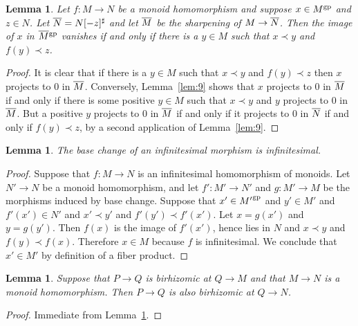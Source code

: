 \documentclass[10pt]{article}
\numberwithin{equation}{section}
\newtheorem{lemma}[paragraph]{Lemma}
\theoremstyle{definition}
\theoremstyle{remark}
\newcommand{\gp}[1]{#1^{\rm gp}}
\renewcommand{\bar}[1]{\overnorm{#1}\vphantom{#1}}
\def\overnorm#1{\overline{#1}\vphantom{#1}}
\begin{document}
\begin{lemma} \label{lem:3}
	Let $f : M \to N$ be a monoid homomorphism and suppose $x \in \gp M$ and $z \in N$.  Let $\bar N = N[-z]^\sharp$ and let $\bar M$ be the sharpening of $M \to \bar N$.  Then the image of $x$ in $\bar M^{\rm gp}$ vanishes if and only if there is a $y \in M$ such that $x \prec y$ and $f(y) \prec z$.
\end{lemma}
\begin{proof}
	It is clear that if there is a $y \in M$ such that $x \prec y$ and $f(y) \prec z$ then $x$ projects to $0$ in $\bar M$.  Conversely, Lemma~\ref{lem:9} shows that $x$ projects to $0$ in $\bar M$ if and only if there is some positive $y \in M$ such that $x \prec y$ and $y$ projects to $0$ in $\bar M$.  But a positive $y$ projects to $0$ in $\bar M$ if and only if it projects to $0$ in $\bar N$ if and only if $f(y) \prec z$, by a second application of Lemma~\ref{lem:9}.
\end{proof}





\begin{lemma} \label{lem:7}
	The base change of an infinitesimal morphism is infinitesimal.
\end{lemma}
\begin{proof}
	Suppose that $f : M \to N$ is an infinitesimal homomorphism of monoids.  Let $N' \to N$ be a monoid homomorphism, and let $f' : M' \to N'$ and $g : M' \to M$ be the morphisms induced by base change.  Suppose that $x' \in {M'}^{\rm gp}$ and $y' \in M'$ and $f'(x') \in N'$ and $x' \prec y'$ and $f'(y') \prec f'(x')$.  Let $x = g(x')$ and $y = g(y')$.  Then $f(x)$ is the image of $f'(x')$, hence lies in $N$ and $x \prec y$ and $f(y) \prec f(x)$.  Therefore $x \in M$ because $f$ is infinitesimal.  We conclude that $x' \in M'$ by definition of a fiber product.
\end{proof}





\begin{lemma} \label{lem:6}
	Suppose that $P \to Q$ is birhizomic at $Q \to M$ and that $M \to N$ is a monoid homomorphism.  Then $P \to Q$ is also birhizomic at $Q \to N$.
\end{lemma}
\begin{proof}
	Immediate from Lemma~\ref{lem:7}.
\end{proof}
\end{document}

